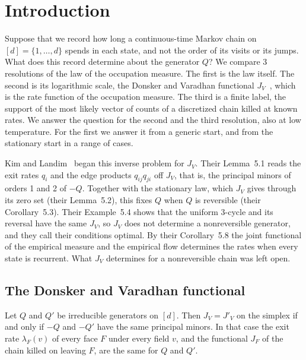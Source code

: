 \section{Introduction}\label{sec:intro}

Suppose that we record how long a continuous-time Markov chain on $[d]=\{1,\dots,d\}$ spends in
each state, and not the order of its visits or its jumps. What does this record determine about
the generator $Q$? We compare 3 resolutions of the law of the occupation measure. The first is the
law itself. The second is its logarithmic scale, the Donsker and Varadhan
functional $J_V$~\cite{dv1975}, which is the rate function of the occupation measure. The third
is a finite label, the support of the most likely vector of counts of a discretized chain killed
at known rates. We answer the question for the second and the third resolution, also at low
temperature. For the first we answer it from a generic start, and from the stationary start in a
range of cases.

Kim and Landim~\cite[Section~5]{kl2024} began this inverse problem for $J_V$. Their Lemma~5.1
reads the exit rates $q_i$ and the edge products $q_{ij}q_{ji}$ off $J_V$, that is, the principal
minors of orders 1 and 2 of $-Q$. Together with the stationary law, which $J_V$ gives through its
zero set (their Lemma~5.2), this fixes $Q$ when $Q$ is reversible (their Corollary~5.3). Their
Example~5.4 shows that the uniform 3-cycle and its reversal have the same $J_V$, so $J_V$ does not
determine a nonreversible generator, and they call their conditions optimal. By their
Corollary~5.8 the joint functional of the empirical measure and the empirical flow determines the
rates when every state is recurrent. What $J_V$ determines for a nonreversible chain was left open.

\subsection{The Donsker and Varadhan functional}\label{sec:intro-dv}

\begin{introtheorem}\label{thm:A}
Let $Q$ and $Q'$ be irreducible generators on $[d]$. Then $J_V=J'_V$ on the simplex if and only if
$-Q$ and $-Q'$ have the same principal minors. In that case the exit rate $\lambda_F(v)$ of every
face $F$ under every field $v$, and the functional $J_F$ of the chain killed on leaving $F$, are
the same for $Q$ and $Q'$.
\end{introtheorem}

